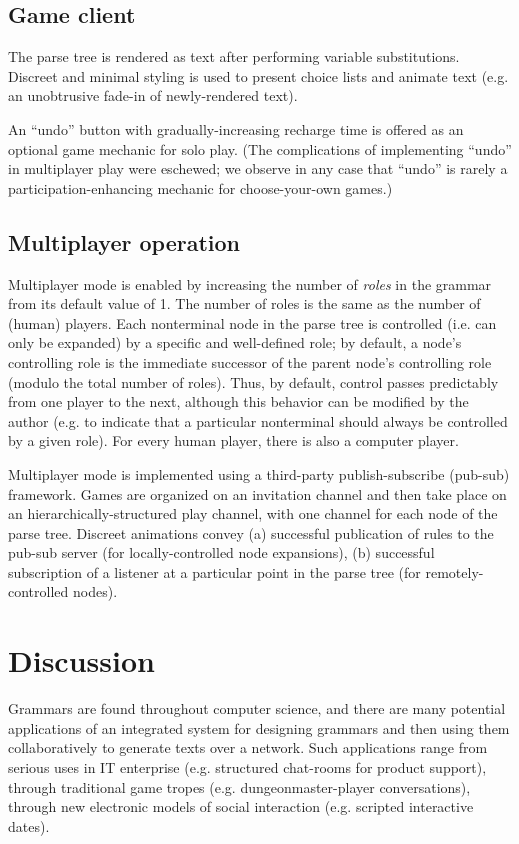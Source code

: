 \documentclass{acm_proc_article-sp}
\begin{document}
\subsection{Game client}

The parse tree is rendered as text after performing variable substitutions.
Discreet and minimal styling is used to present choice lists and animate text
(e.g. an unobtrusive fade-in of newly-rendered text).

An ``undo'' button with gradually-increasing recharge time is offered as an optional game mechanic for solo play.
(The complications of implementing ``undo'' in multiplayer play were eschewed;
 we observe in any case that ``undo'' is rarely a participation-enhancing mechanic for choose-your-own games.)

\subsection{Multiplayer operation}

Multiplayer mode is enabled by increasing the number of {\em roles} in the grammar from its default value of 1.
The number of roles is the same as the number of (human) players.
Each nonterminal node in the parse tree is controlled (i.e. can only be expanded) by a specific and well-defined role;
by default, a node's controlling role is the immediate successor of the parent node's controlling role
(modulo the total number of roles).
Thus, by default, control passes predictably from one player to the next,
although this behavior can be modified by the author (e.g. to indicate that a particular nonterminal
should always be controlled by a given role).
For every human player, there is also a computer player.

Multiplayer mode is implemented using a third-party publish-subscribe (pub-sub) framework.
Games are organized on an invitation channel and then take place on an hierarchically-structured
play channel, with one channel for each node of the parse tree.
Discreet animations convey
 (a) successful publication of rules to the pub-sub server (for locally-controlled node expansions),
 (b) successful subscription of a listener at a particular point in the parse tree (for remotely-controlled nodes).

\section{Discussion}

Grammars are found throughout computer science,
and there are many potential applications of an
integrated system for designing grammars and then using them collaboratively to generate texts over a network.
Such applications range from
serious uses in IT enterprise (e.g. structured chat-rooms for product support),
through traditional game tropes (e.g. dungeonmaster-player conversations),
through new electronic models of social interaction (e.g. scripted interactive dates).
\end{document}
